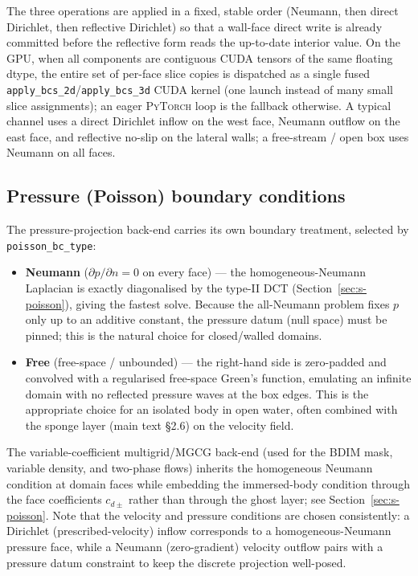 \documentclass[10pt,onecolumn]{article}
\newcommand{\pytorch}{\textsc{PyTorch}\xspace}
\begin{document}
The three operations are applied in a fixed, stable order
(Neumann, then direct Dirichlet, then reflective Dirichlet) so that a
wall-face direct write is already committed before the reflective form
reads the up-to-date interior value.  On the GPU, when all components
are contiguous CUDA tensors of the same floating dtype, the entire set
of per-face slice copies is dispatched as a single fused
\texttt{apply\_bcs\_2d}/\texttt{apply\_bcs\_3d} CUDA kernel (one launch
instead of many small slice assignments); an eager \pytorch loop is the
fallback otherwise.  A typical channel uses a direct Dirichlet inflow on
the west face, Neumann outflow on the east face, and reflective no-slip
on the lateral walls; a free-stream / open box uses Neumann on all
faces.

\subsection{Pressure (Poisson) boundary conditions}

The pressure-projection back-end carries its own boundary treatment,
selected by \texttt{poisson\_bc\_type}:

\begin{itemize}
\item \textbf{Neumann} ($\partial p/\partial n = 0$ on every face) — the
  homogeneous-Neumann Laplacian is exactly diagonalised by the type-II
  DCT (Section~\ref{sec:s-poisson}), giving the fastest solve.  Because
  the all-Neumann problem fixes $p$ only up to an additive constant, the
  pressure datum (null space) must be pinned; this is the natural choice
  for closed/walled domains.
\item \textbf{Free} (free-space / unbounded) — the right-hand side is
  zero-padded and convolved with a regularised free-space Green's
  function, emulating an infinite domain with no reflected pressure
  waves at the box edges.  This is the appropriate choice for an
  isolated body in open water, often combined with the sponge layer
  (main text \S2.6) on the velocity field.
\end{itemize}

The variable-coefficient multigrid/MGCG back-end (used for the BDIM
mask, variable density, and two-phase flows) inherits the homogeneous
Neumann condition at domain faces while embedding the immersed-body
condition through the face coefficients $c_{d\pm}$ rather than through
the ghost layer; see Section~\ref{sec:s-poisson}.  Note that the
velocity and pressure conditions are chosen consistently: a Dirichlet
(prescribed-velocity) inflow corresponds to a homogeneous-Neumann
pressure face, while a Neumann (zero-gradient) velocity outflow pairs
with a pressure datum constraint to keep the discrete projection
well-posed.
\end{document}

